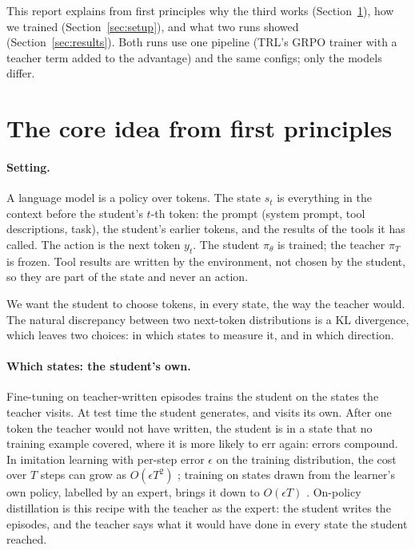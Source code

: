 \documentclass[11pt,a4paper]{article}
\newcommand{\pis}{\pi_\theta}
\newcommand{\pit}{\pi_T}
\begin{document}
This report explains from first principles why the third works
(Section~\ref{sec:principle}), how we trained (Section~\ref{sec:setup}), and
what two runs showed (Section~\ref{sec:results}). Both runs use one pipeline
(TRL's GRPO trainer with a teacher term added to the advantage) and the same
configs; only the models differ.

\section{The core idea from first principles}
\label{sec:principle}

\paragraph{Setting.}
A language model is a policy over tokens. The state $s_t$ is everything in
the context before the student's $t$-th token: the prompt (system prompt,
tool descriptions, task), the student's earlier tokens, and the results of
the tools it has called. The action is the next token $y_t$. The student
$\pis$ is trained; the teacher $\pit$ is frozen. Tool results are written by
the environment, not chosen by the student, so they are part of the state
and never an action.

We want the student to choose tokens, in every state, the way the teacher
would. The natural discrepancy between two next-token distributions is a KL
divergence, which leaves two choices: in which states to measure it, and in
which direction.

\paragraph{Which states: the student's own.}
Fine-tuning on teacher-written episodes trains the student on the states
the teacher visits. At test time the student generates, and visits its own.
After one token the teacher would not have written, the student is in a
state that no training example covered, where it is more likely to err
again: errors compound. In imitation learning with per-step error $\epsilon$
on the training distribution, the cost over $T$ steps can grow as
$O(\epsilon T^2)$ \citep{ross2010efficient}; training on states drawn from
the learner's own policy, labelled by an expert, brings it down to
$O(\epsilon T)$ \citep[DAgger;][]{ross2011dagger}. On-policy distillation is
this recipe with the teacher as the expert: the student writes the episodes,
and the teacher says what it would have done in every state the student
reached.
\end{document}
